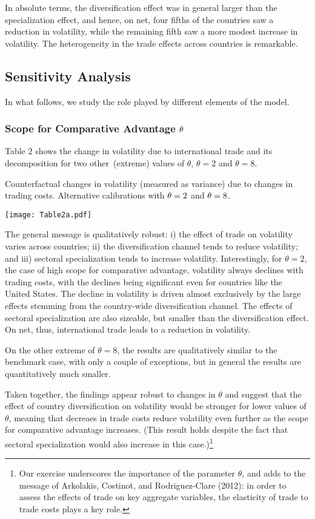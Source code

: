 \documentclass[12pt]{article}
\begin{document}
In absolute terms, the diversification effect was in general larger than the
specialization effect, and hence, on net, four fifths of the countries saw a
reduction in volatility, while the remaining fifth saw a more modest
increase in volatility. The heterogeneity in the trade effects across
countries is remarkable.

\subsection{Sensitivity Analysis}

In what follows, we study the role played by different elements of the model.

\subsubsection{Scope for Comparative Advantage $\protect\theta $}

Table $2$ shows the change in volatility due to international trade and its
decomposition for two other\ (extreme) values of $\theta $, $\theta =2$ and $%
\theta =8.$ 

\begin{table}[h]
\caption{Counterfactual changes in volatility (measured as variance) due to
changes in trading costs. Alternative calibrations with $\protect\theta =2$
and $\protect\theta =8$.}\centering\texttt{[image: Table2a.pdf]}
\end{table}
The general message is qualitatively robust: i) the effect of trade on
volatility varies across countries; ii) the diversification channel tends to
reduce volatility; and iii) sectoral specialization tends to increase
volatility. Interestingly, for $\theta =2$, the case of high scope for
comparative advantage, volatility always declines with trading costs, with
the declines being significant even for countries like the United States.
The decline in volatility is driven almost exclusively by the large effects
stemming from the country-wide diversification channel. The effects of
sectoral specialization are also sizeable, but smaller than the
diversification effect. On net, thus, international trade leads to a
reduction in volatility.

On the other extreme of $\theta =8$, the results are qualitatively similar
to the benchmark case, with only a couple of exceptions, but in general the
results are quantitatively much smaller.

Taken together, the findings appear robust to changes in $\theta $ and
suggest that the effect of country diversification on volatility would be
stronger for lower values of $\theta $, meaning that decreaes in trade costs
reduce volatility even further as the scope for comparative advantage
increases. (This result holds despite the fact that sectoral specialization
would also increase in this case.)\footnote{%
Our exercise underscores the importance of the parameter $\theta $, and adds
to the message of Arkolakis, Costinot, and Rodriguez-Clare (2012): in order
to assess the effects of trade on key aggregate variables, the elasticity of
trade to trade costs plays a key role.}
\end{document}
